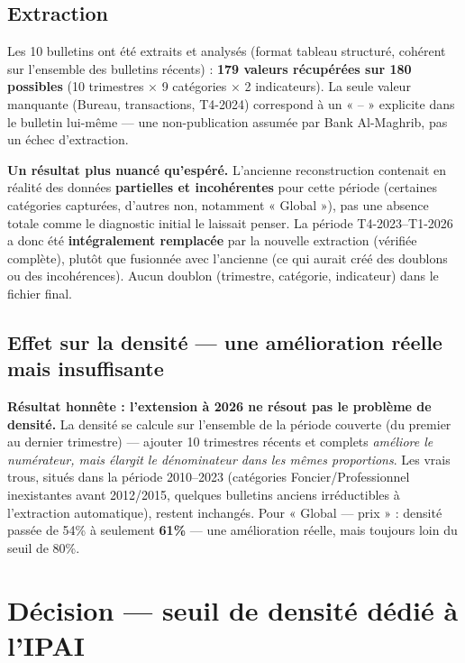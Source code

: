 \documentclass[11pt,a4paper]{article}
\begin{document}
\subsection{Extraction}

Les 10 bulletins ont été extraits et analysés (format tableau structuré, cohérent sur l'ensemble des bulletins récents) : \textbf{179 valeurs récupérées sur 180 possibles} (10 trimestres × 9 catégories × 2 indicateurs). La seule valeur manquante (Bureau, transactions, T4-2024) correspond à un « -- » explicite dans le bulletin lui-même --- une non-publication assumée par Bank Al-Maghrib, pas un échec d'extraction.

\begin{alertebox}
\textbf{Un résultat plus nuancé qu'espéré.} L'ancienne reconstruction contenait en réalité des données \textbf{partielles et incohérentes} pour cette période (certaines catégories capturées, d'autres non, notamment « Global »), pas une absence totale comme le diagnostic initial le laissait penser. La période T4-2023--T1-2026 a donc été \textbf{intégralement remplacée} par la nouvelle extraction (vérifiée complète), plutôt que fusionnée avec l'ancienne (ce qui aurait créé des doublons ou des incohérences). Aucun doublon (trimestre, catégorie, indicateur) dans le fichier final.
\end{alertebox}

\subsection{Effet sur la densité --- une amélioration réelle mais insuffisante}

\begin{noteboxbleu}
\textbf{Résultat honnête : l'extension à 2026 ne résout pas le problème de densité.} La densité se calcule sur l'ensemble de la période couverte (du premier au dernier trimestre) --- ajouter 10 trimestres récents et complets \emph{améliore le numérateur, mais élargit le dénominateur dans les mêmes proportions}. Les vrais trous, situés dans la période 2010--2023 (catégories Foncier/Professionnel inexistantes avant 2012/2015, quelques bulletins anciens irréductibles à l'extraction automatique), restent inchangés. Pour « Global — prix » : densité passée de 54\% à seulement \textbf{61\%} --- une amélioration réelle, mais toujours loin du seuil de 80\%.
\end{noteboxbleu}

\section{Décision --- seuil de densité dédié à l'IPAI}
\label{sec:seuil}
\end{document}
